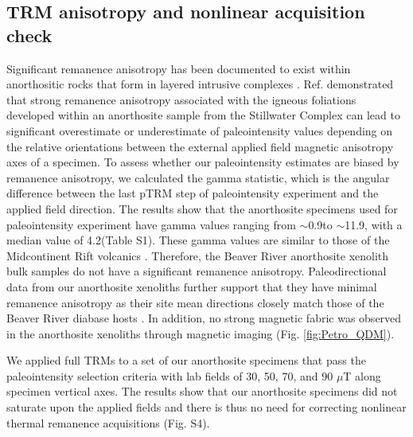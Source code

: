 \documentclass[9pt,twocolumn,twoside,lineno]{pnas-new}
\begin{document}
\subsection*{TRM anisotropy and nonlinear acquisition check}
Significant remanence anisotropy has been documented to exist within anorthositic rocks that form in layered intrusive complexes \cite{Selkin2000a, Feinberg2006a}. Ref. \citealp{Selkin2000a} demonstrated that strong remanence anisotropy associated with the igneous foliations developed within an anorthosite sample from the Stillwater Complex can lead to significant overestimate or underestimate of paleointensity values depending on the relative orientations between the external applied field magnetic anisotropy axes of a specimen. To assess whether our paleointensity estimates are biased by remanence anisotropy, we calculated the gamma statistic, which is the angular difference between the last pTRM step of paleointensity experiment and the applied field direction. The results show that the anorthosite specimens used for paleointensity experiment have gamma values ranging from $\sim$0.9\textdegree to $\sim$11.9\textdegree, with a median value of 4.2\textdegree (Table S1). These gamma values are similar to those of the Midcontinent Rift volcanics \cite{Sprain2018a}. Therefore, the Beaver River anorthosite xenolith bulk samples do not have a significant remanence anisotropy. Paleodirectional data from our anorthosite xenoliths further support that they have minimal remanence anisotropy as their site mean directions closely match those of the Beaver River diabase hosts \cite{Zhang2021b}. In addition, no strong magnetic fabric was observed in the anorthosite xenoliths through magnetic imaging (Fig. \ref{fig:Petro_QDM}). 

We applied full TRMs to a set of our anorthosite specimens that pass the paleointensity selection criteria with lab fields of 30, 50, 70, and 90 $\mu$T along specimen vertical axes. The results show that our anorthosite specimens did not saturate upon the applied fields and there is thus no need for correcting nonlinear thermal remanence acquisitions (Fig. S4). 

\end{document}
